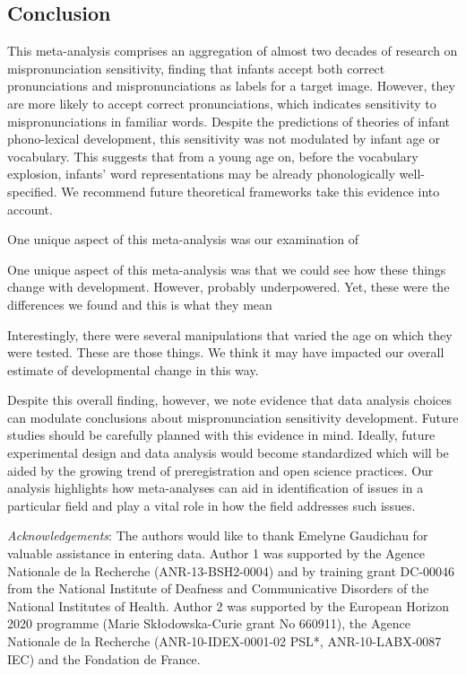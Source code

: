 \documentclass[man]{apa6}
\theoremstyle{definition}
\theoremstyle{definition}
\theoremstyle{definition}
\theoremstyle{remark}
\begin{document}
\subsection{Conclusion}\label{conclusion}

This meta-analysis comprises an aggregation of almost two decades of
research on mispronunciation sensitivity, finding that infants accept
both correct pronunciations and mispronunciations as labels for a target
image. However, they are more likely to accept correct pronunciations,
which indicates sensitivity to mispronunciations in familiar words.
Despite the predictions of theories of infant phono-lexical development,
this sensitivity was not modulated by infant age or vocabulary. This
suggests that from a young age on, before the vocabulary explosion,
infants' word representations may be already phonologically
well-specified. We recommend future theoretical frameworks take this
evidence into account.

One unique aspect of this meta-analysis was our examination of

One unique aspect of this meta-analysis was that we could see how these
things change with development. However, probably underpowered. Yet,
these were the differences we found and this is what they mean

Interestingly, there were several manipulations that varied the age on
which they were tested. These are those things. We think it may have
impacted our overall estimate of developmental change in this way.

Despite this overall finding, however, we note evidence that data
analysis choices can modulate conclusions about mispronunciation
sensitivity development. Future studies should be carefully planned with
this evidence in mind. Ideally, future experimental design and data
analysis would become standardized which will be aided by the growing
trend of preregistration and open science practices. Our analysis
highlights how meta-analyses can aid in identification of issues in a
particular field and play a vital role in how the field addresses such
issues.

\newpage

\emph{Acknowledgements}: The authors would like to thank Emelyne
Gaudichau for valuable assistance in entering data. Author 1 was
supported by the Agence Nationale de la Recherche (ANR-13-BSH2-0004) and
by training grant DC-00046 from the National Institute of Deafness and
Communicative Disorders of the National Institutes of Health. Author 2
was supported by the European Horizon 2020 programme (Marie
Skłodowska-Curie grant No 660911), the Agence Nationale de la Recherche
(ANR-10-IDEX-0001-02 PSL*, ANR-10-LABX-0087 IEC) and the Fondation de
France.
\end{document}
